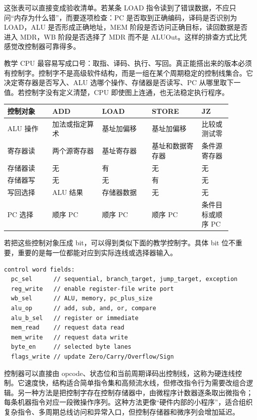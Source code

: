这张表可以直接变成验收清单。若某条 LOAD 指令读到了错误数据，不应只问“内存为什么错”，而要逐项检查：PC 是否取到正确编码，译码是否识别为 LOAD，ALU 是否形成正确地址，MEM 阶段是否访问正确目标，读回数据是否进入 MDR，WB 阶段是否选择了 MDR 而不是 ALUOut。这样的排查方式比凭感觉改控制器可靠得多。

教学 CPU 最容易写成口号：取指、译码、执行、写回。真正能搭出来的版本必须有控制字。控制字不是高级软件结构，而是一组在某个周期稳定的控制线集合。它决定寄存器是否写入、ALU 选哪个操作、存储器是否读写、PC 从哪里取下一值。若控制字没有定义清楚，CPU 即使图上连通，也无法稳定执行程序。

\begin{longtable}{L{0.18\linewidth}L{0.2\linewidth}L{0.2\linewidth}L{0.2\linewidth}L{0.12\linewidth}}
\toprule
控制对象 & ADD & LOAD & STORE & JZ \\
\midrule
ALU 操作 & 加法或指定算术 & 基址加偏移 & 基址加偏移 & 比较或测试零 \\
寄存器读 & 两个源寄存器 & 基址寄存器 & 基址和数据寄存器 & 条件源寄存器 \\
存储器读 & 无 & 有 & 无 & 无 \\
存储器写 & 无 & 无 & 有 & 无 \\
写回选择 & ALU 结果 & 存储器数据 & 无 & 无 \\
PC 选择 & 顺序 PC & 顺序 PC & 顺序 PC & 条件目标或顺序 PC \\
\bottomrule
\end{longtable}

若把这些控制对象压成 bit，可以得到类似下面的教学控制字。具体 bit 位不重要，重要的是每一位都能对应到实际连线或选择器输入。

\begin{lstlisting}
control word fields:
  pc_sel      // sequential, branch_target, jump_target, exception
  reg_write   // enable register-file write port
  wb_sel      // ALU, memory, pc_plus_size
  alu_op      // add, sub, and, or, compare
  alu_b_sel   // register or immediate
  mem_read    // request data read
  mem_write   // request data write
  byte_en     // selected byte lanes
  flags_write // update Zero/Carry/Overflow/Sign
\end{lstlisting}

控制器可以直接由 opcode、状态位和当前周期译码出控制线，这称为硬连线控制。它速度快，结构适合简单指令集和高频流水线，但修改指令行为需要改组合逻辑。另一种方法是把控制字存在控制存储器中，由微程序计数器逐条取出微指令；每条机器指令对应一段微操作序列。这种方法更像“硬件内部的小程序”，适合组织复杂指令、多周期总线访问和异常入口，但控制存储器和微序列会增加延迟。

